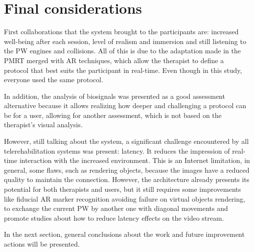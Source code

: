 \section{Final considerations}

First collaborations that the system brought to the participants are: increased well-being after each session, level of realism and immersion and still listening to the PW engines and collisions. All of this is due to the adaptation made in the PMRT merged with AR techniques, which allow the therapist to define a protocol that best suits the participant in real-time. Even though in this study, everyone used the same protocol. 

In addition, the analysis of biosignals was presented as a good assessment alternative because it allows realizing how deeper and challenging a protocol can be for a user, allowing for another assessment, which is not based on the therapist's visual analysis.

However, still talking about the system, a significant challenge encountered by all telerehabilitation systems was present: latency. It reduces the impression of real-time interaction with the increased environment. This is an Internet limitation, in general, some flaws, such as rendering objects, because the images have a reduced quality to maintain the connection.
However, the architecture already presents its potential for both therapists and users, but it still requires some improvements like fiducial AR marker recognition avoiding failure on virtual objects rendering, to exchange the current PW by another one with diagonal movements and promote studies about how to reduce latency effects on the video stream.

In the next section, general conclusions about the work and future improvement actions will be presented.

 